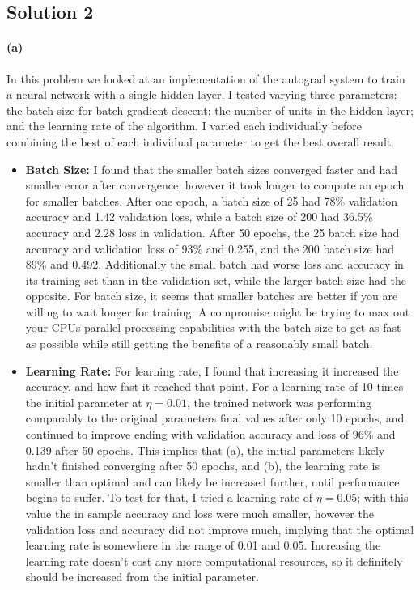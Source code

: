 \documentclass{article}
\newcommand{\solution}[1]{\clearpage \subsection*{Solution #1}}
\newcommand{\spart}[1]{\paragraph{(#1)}}
\begin{document}
\solution{2} 
\spart{a} In this problem we looked at an implementation of the autograd system to train a neural network with a single hidden layer. I tested varying three parameters: the batch size for batch gradient descent; the number of units in the hidden layer; and the learning rate of the algorithm. I varied each individually before combining the best of each individual parameter to get the best overall result. 
\begin{itemize}
	\item \textbf{Batch Size:} I found that the smaller batch sizes converged faster and had smaller error after convergence, however it took longer to compute an epoch for smaller batches. After one epoch, a batch size of 25 had 78\% validation accuracy and 1.42 validation loss, while a batch size of 200 had 36.5\% accuracy and 2.28 loss in validation. After 50 epochs, the 25 batch size had accuracy and validation loss of 93\% and 0.255, and the 200 batch size had 89\% and 0.492. Additionally the small batch had worse loss and accuracy in its training set than in the validation set, while the larger batch size had the opposite. For batch size, it seems that smaller batches are better if you are willing to wait longer for training. A compromise might be trying to max out your CPUs parallel processing capabilities with the batch size to get as fast as possible while still getting the benefits of a reasonably small batch.
	\item \textbf{Learning Rate:} For learning rate, I found that increasing it increased the accuracy, and how fast it reached that point. For a learning rate of 10 times the initial parameter at $\eta = 0.01$, the trained network was performing comparably to the original parameters final values after only 10 epochs, and continued to improve ending with validation accuracy and loss of 96\% and 0.139 after 50 epochs. This implies that (a), the initial parameters likely hadn't finished converging after 50 epochs, and (b), the learning rate is smaller than optimal and can likely be increased further, until performance begins to suffer. To test for that, I tried a learning rate of $\eta = 0.05$; with this value the in sample accuracy and loss were much smaller, however the validation loss and accuracy did not improve much, implying that the optimal learning rate is somewhere in the range of 0.01 and 0.05. Increasing the learning rate doesn't cost any more computational resources, so it definitely should be increased from the initial parameter. 

\end{itemize}
\end{document}
